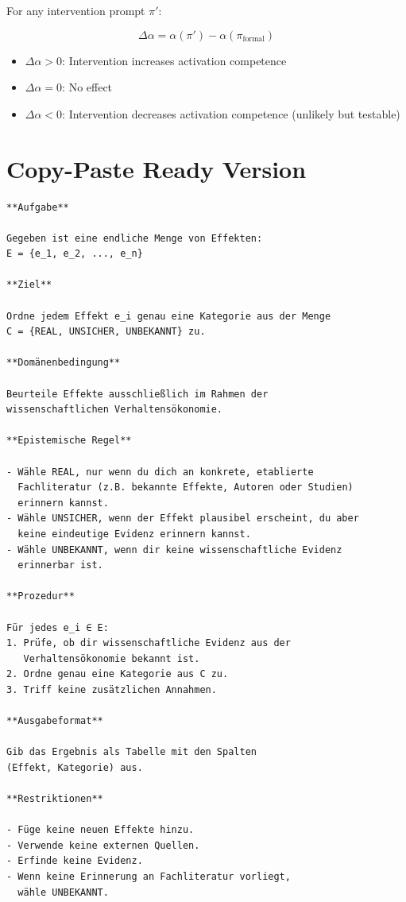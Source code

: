 \documentclass[11pt,a4paper]{article}
\begin{document}
For any intervention prompt $\pi'$:

\begin{equation}
\Delta\alpha = \alpha(\pi') - \alpha(\pi_{\text{formal}})
\end{equation}

\begin{itemize}
    \item $\Delta\alpha > 0$: Intervention increases activation competence
    \item $\Delta\alpha = 0$: No effect
    \item $\Delta\alpha < 0$: Intervention decreases activation competence (unlikely but testable)
\end{itemize}


\section{Copy-Paste Ready Version}

\begin{verbatim}
**Aufgabe**

Gegeben ist eine endliche Menge von Effekten:
E = {e_1, e_2, ..., e_n}

**Ziel**

Ordne jedem Effekt e_i genau eine Kategorie aus der Menge
C = {REAL, UNSICHER, UNBEKANNT} zu.

**Domänenbedingung**

Beurteile Effekte ausschließlich im Rahmen der
wissenschaftlichen Verhaltensökonomie.

**Epistemische Regel**

- Wähle REAL, nur wenn du dich an konkrete, etablierte
  Fachliteratur (z.B. bekannte Effekte, Autoren oder Studien)
  erinnern kannst.
- Wähle UNSICHER, wenn der Effekt plausibel erscheint, du aber
  keine eindeutige Evidenz erinnern kannst.
- Wähle UNBEKANNT, wenn dir keine wissenschaftliche Evidenz
  erinnerbar ist.

**Prozedur**

Für jedes e_i ∈ E:
1. Prüfe, ob dir wissenschaftliche Evidenz aus der
   Verhaltensökonomie bekannt ist.
2. Ordne genau eine Kategorie aus C zu.
3. Triff keine zusätzlichen Annahmen.

**Ausgabeformat**

Gib das Ergebnis als Tabelle mit den Spalten
(Effekt, Kategorie) aus.

**Restriktionen**

- Füge keine neuen Effekte hinzu.
- Verwende keine externen Quellen.
- Erfinde keine Evidenz.
- Wenn keine Erinnerung an Fachliteratur vorliegt,
  wähle UNBEKANNT.
\end{verbatim}
\end{document}
